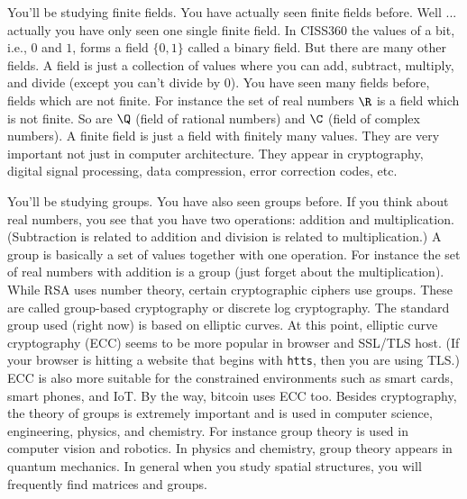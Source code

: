 \begin{itemize}
  \li
  You'll be studying finite fields.
  You have actually seen finite fields before.
  Well ... actually you have only seen one single finite field.
  In CISS360 the values of a bit, i.e., $0$ and $1$,
  forms a field $\{0, 1\}$ called a binary field.
  But there are many other fields.
  A field is just a collection of values where you can
  add, subtract, multiply, and divide (except you can't
  divide by 0).
  You have seen many fields before, fields which are not finite.
  For instance the set of real numbers $\R$ is a field which is not finite.
  So are $\Q$ (field of rational numbers) and $\C$ (field of
  complex numbers).
  A finite field is just a field with finitely many values.
  They are very important not just in
  computer architecture.
  They appear in cryptography, digital signal processing, data compression,
  error correction codes, etc.

  \li
  You'll be studying groups.
  You have also seen groups before.
  If you think about real numbers, you see that you have two
  operations: addition and multiplication.
  (Subtraction is related to addition and division is related to
  multiplication.)
  A group is basically a set of values together with one operation.
  For instance the set of real numbers with addition is a group
  (just forget about the multiplication).
  While RSA uses number theory,
  certain cryptographic ciphers use
  groups.
  These are called group-based cryptography or discrete log cryptography.
  The standard group used (right now) is based on
  elliptic curves.
  At this point, elliptic curve cryptography (ECC) seems to be more
  popular in browser and SSL/TLS host.
  (If your browser is hitting a website that begins with \verb!htts!,
  then you are using TLS.)
  ECC is also more suitable for the constrained environments such as
  smart cards, smart phones, and IoT.
  By the way, bitcoin uses ECC too.
  Besides cryptography, the theory of groups is extremely important
  and is used in computer science, engineering, physics, and chemistry.
  For instance group theory is used in
  computer vision and robotics.
  In physics and chemistry, group theory appears in quantum mechanics.
  In general when you study spatial structures, you will frequently
  find matrices and groups.


\end{itemize}
